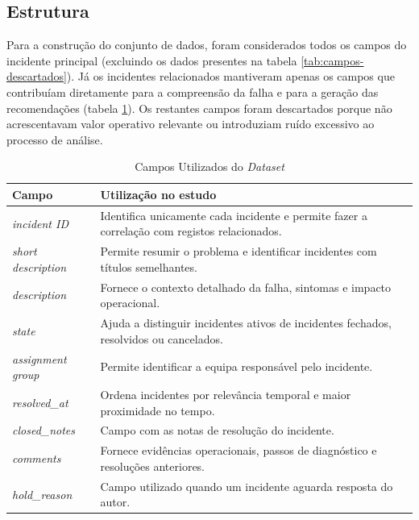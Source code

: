 	\subsection{Estrutura}
		Para a construção do conjunto de dados, foram considerados todos os campos do incidente principal (excluindo os dados presentes na tabela \ref{tab:campos-descartados}). Já os incidentes relacionados mantiveram apenas os campos que contribuíam diretamente para a compreensão da falha e para a geração das recomendações (tabela \ref{tab:campos-utilizados}). Os restantes campos foram descartados porque não acrescentavam valor operativo relevante ou introduziam ruído excessivo ao processo de análise.
		
		\begin{table}[H]
			\centering
			\begin{tabular}{|p{3cm}|p{10cm}|}
				\hline
				\textbf{Campo} & \textbf{Utilização no estudo} \\
				\hline
				\textit{incident ID} & Identifica unicamente cada incidente e permite fazer a correlação com registos relacionados. \\
				\hline
				\textit{short description} & Permite resumir o problema e identificar incidentes com títulos semelhantes. \\
				\hline
				\textit{description} & Fornece o contexto detalhado da falha, sintomas e impacto operacional. \\
				\hline
				\textit{state} & Ajuda a distinguir incidentes ativos de incidentes fechados, resolvidos ou cancelados. \\
				\hline
				\textit{assignment group} & Permite identificar a equipa responsável pelo incidente. \\
				\hline
				\textit{resolved\_at} & Ordena incidentes por relevância temporal e maior proximidade no tempo. \\
				\hline
				\textit{closed\_notes} & Campo com as notas de resolução do incidente. \\
				\hline
				\textit{comments} & Fornece evidências operacionais, passos de diagnóstico e resoluções anteriores. \\
				\hline
				\textit{hold\_reason} & Campo utilizado quando um incidente aguarda resposta do autor. \\
				\hline
			\end{tabular}
			\caption[Campos Utilizados do \textit{Dataset}]{Campos Utilizados do \textit{Dataset}}
			\label{tab:campos-utilizados}
		\end{table}
		
